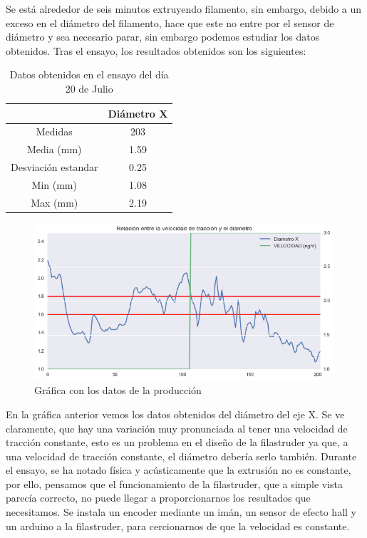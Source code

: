 Se está alrededor de seis minutos extruyendo filamento, sin embargo, debido a un exceso en el diámetro del filamento, hace que este no entre por el sensor de diámetro y sea necesario parar, sin embargo podemos estudiar los datos obtenidos.
Tras el ensayo, los resultados obtenidos son los siguientes:

\begin{table}[H]
    \centering
    \begin{tabular}{cc}
               & Diámetro X \\ \hline
    Medidas    & 203        \\
    Media (mm) & 1.59       \\
    Desviación estandar & 0.25\\
    Min (mm)   & 1.08       \\
    Max (mm)   & 2.19      
    \end{tabular}
    \caption{Datos obtenidos en el ensayo del día 20 de Julio}
    \label{tab:20007105-dat}
\end{table}


\begin{figure}[H]
    \centering
    \includegraphics[width=0.99\textwidth]{images/producciones/20072015/graficas.png}
    \caption{Gráfica con los datos de la producción}
    \label{fig:2007105-graf}
\end{figure}

En la gráfica anterior vemos los datos obtenidos del diámetro del eje X. Se ve claramente, que hay una variación muy pronunciada al tener una velocidad de tracción constante, esto es un problema en el diseño de la filastruder ya que, a una velocidad de tracción constante, el diámetro debería serlo también. Durante el ensayo, se ha notado física y acústicamente que la extrusión no es constante, por ello, pensamos que el funcionamiento de la filastruder, que a simple vista parecía correcto, no puede llegar a proporcionarnos los resultados que necesitamos. Se instala un encoder mediante un imán, un sensor de efecto hall y un arduino a la filastruder, para cercionarnos de que la velocidad es constante.

